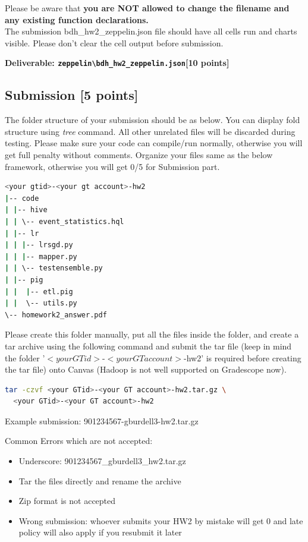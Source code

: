 \documentclass[12pt]{article}
\begin{document}
Please be aware that \textbf{\color{red} you are NOT allowed to change the filename and any existing function declarations.}\\

The submission bdh\_hw2\_zeppelin.json file should have all cells run and charts visible. Please don't clear the cell output before submission.

\textbf{Deliverable: \texttt{zeppelin\textbackslash bdh\_hw2\_zeppelin.json}[10 points]}
\fi

\subsection{Submission [5 points]}
The folder structure of your submission should be as below. You can display fold structure using \textit{tree} command. All other unrelated files will be discarded during testing.
Please make sure your code can compile/run normally, otherwise you will get full penalty without comments. Organize your files same as the below framework, otherwise you will get 0/5 for Submission part.
\begin{lstlisting}[language=bash,frame=single]
<your gtid>-<your gt account>-hw2
|-- code
| |-- hive
| | \-- event_statistics.hql
| |-- lr
| | |-- lrsgd.py
| | |-- mapper.py
| | \-- testensemble.py
| |-- pig
| |  |-- etl.pig
| |  \-- utils.py
\-- homework2_answer.pdf
\end{lstlisting}

Please create this folder manually, put all the files inside the folder, and create a tar archive using the following command and submit the tar file (keep in mind the folder '$<your GTid>$-$<your GT account>$-hw2' is required before creating the tar file) onto Canvas (Hadoop is not well supported on Gradescope now).
\begin{lstlisting}[language=bash,frame=single]
tar -czvf <your GTid>-<your GT account>-hw2.tar.gz \
  <your GTid>-<your GT account>-hw2
\end{lstlisting}
Example submission: 901234567-gburdell3-hw2.tar.gz
\newline

\noindent Common Errors which are not accepted:
\begin{itemize}
\item Underscore: 901234567\_gburdell3\_hw2.tar.gz   
\item Tar the files directly and rename the archive
\item Zip format is not accepted
\item Wrong submission: whoever submits your HW2 by mistake will get 0 and late policy will also apply if you resubmit it later
\end{itemize}
\end{document}
